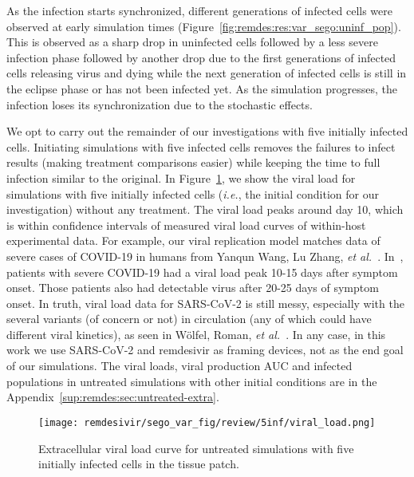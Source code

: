 As the infection starts synchronized, different generations of infected cells were observed at early simulation times (Figure~\ref{fig:remdes:res:var_sego:uninf_pop}). This is observed as a  sharp drop in uninfected cells followed by a less severe infection phase followed by another drop due to the first generations of infected cells releasing virus and dying while the next generation of infected cells is still in the eclipse phase or has not been infected yet. As the simulation progresses, the infection loses its synchronization due to the stochastic effects.

We opt to carry out the remainder of our investigations with five initially infected cells. Initiating simulations with five infected cells removes the failures to infect results (making treatment comparisons easier) while keeping the time to full infection similar to the original. In Figure~\ref{fig:remdes:res:var_sego:load:5inf}, we show the viral load for simulations with five initially infected cells (\textit{i.e.}, the initial condition for our investigation) without any treatment. The viral load peaks around day 10, which is within confidence intervals of measured viral load curves of within-host experimental data. For example, our viral replication model matches data of severe cases of COVID-19 in humans from Yanqun Wang, Lu Zhang, \textit{et al.}~\cite{wang2020kinetics}. In~\cite{wang2020kinetics}, patients with severe COVID-19 had a viral load peak 10-15 days after symptom onset. Those patients also had detectable virus after 20-25 days of symptom onset. In truth, viral load data for SARS-CoV-2 is still messy, especially with the several variants (of concern or not) in circulation (any of which could have different viral kinetics), as seen in Wölfel, Roman, \textit{et al.}~\cite{wolfel2020virological}. In any case, in this work we use SARS-CoV-2 and remdesivir as framing devices, not as the end goal of our simulations. The viral loads, viral production AUC and infected populations in untreated simulations with other initial conditions are in the Appendix~\ref{sup:remdes:sec:untreated-extra}.

\begin{figure}[H]
\centering
    \texttt{[image: remdesivir/sego\_var\_fig/review/5inf/viral\_load.png]}
    \caption{Extracellular viral load curve for untreated simulations with five initially infected cells in the tissue patch.}
    \label{fig:remdes:res:var_sego:load:5inf}
\end{figure}



